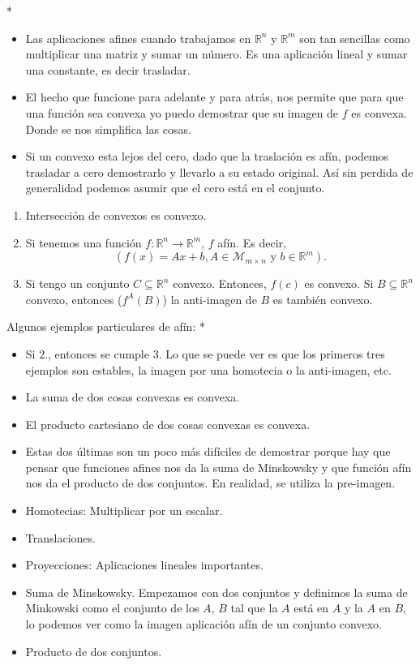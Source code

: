 \begin{paracol}{2}
    \switchcolumn[1]*{\noindent\scriptsize
	\begin{itemize}
	    \item Las aplicaciones afines cuando trabajamos en $\mathbb{R}^n$ y $\mathbb{R}^m$ son tan sencillas como multiplicar una matriz y sumar un número. Es una aplicación lineal y sumar una constante, es decir trasladar.
	    \item El hecho que funcione para adelante y para atrás, nos permite que para que una función sea convexa yo puedo demostrar que su imagen de $f$ es convexa. Donde se nos simplifica las cosas.
	    \item Si un convexo esta lejos del cero, dado que la traslación es afín, podemos trasladar a cero demostrarlo y llevarlo a su estado original. Así sin perdida de generalidad podemos asumir que el cero está en el conjunto.
	\end{itemize}
}
\switchcolumn[0]\noindent
\begin{enumerate}[\bfseries 1.]
    \item Intersección de convexos es convexo.
    \item Si tenemos una función $f:\mathbb{R}^n\to \mathbb{R}^m$, $f$ afín. Es decir, 
    $$\left(f(x)=Ax+b, A\in \mathcal{M}_{m\times n} \text{ y } b\in \mathbb{R}^m\right).$$
\item Si tengo un conjunto $C\subseteq \mathbb{R}^n$ convexo. Entonces, $f(c)$ es convexo. Si $B\subseteq \mathbb{R}^n$ convexo, entonces ($f^{A}(B)$) la anti-imagen de $B$ es también convexo. 
\end{enumerate}

Algunos ejemplos particulares de afín:
\switchcolumn[1]*{\noindent\scriptsize
    \begin{itemize}
	\item Si 2., entonces se cumple 3. Lo que se puede ver es que los primeros tres ejemplos son estables, la imagen por una homotecia o la anti-imagen, etc.
	\item La suma de dos cosas convexas es convexa.
	\item El producto cartesiano de dos cosas convexas es convexa.
	\item Estas dos últimas son un poco más difíciles de demostrar porque hay que pensar que funciones afines nos da la suma de Minskowsky y que función afín nos da el producto de dos conjuntos. En realidad, se utiliza la pre-imagen.
    \end{itemize}
}
\switchcolumn[0]\noindent
\begin{itemize}
    \item  Homotecias: Multiplicar por un escalar.
    \item Translaciones.
    \item Proyecciones: Aplicaciones lineales importantes.
    \item Suma de Minskowsky.
	Empezamos con dos conjuntos y definimos la suma de Minkowski como el conjunto de los $A$, $B$ tal que la $A$ está en $A$ y la $A$ en $B$, lo podemos ver como la imagen aplicación afín de un conjunto convexo.
    \item Producto de dos conjuntos.
\end{itemize}



\end{paracol}
